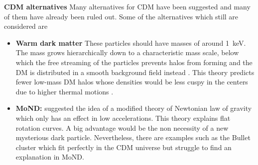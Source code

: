 \textbf{\ac{CDM} alternatives} Many alternatives for \ac{CDM} have been suggested and many of them have already been ruled out. Some of the alternatives which still are considered are 
\begin{itemize}
    \item \textbf{Warm dark matter} These particles should have masses of around \SI{1}{keV}. The mass grows hierarchically down to a characteristic mass scale, below which the free streaming of the particles prevents halos from forming and the \ac{DM} is distributed in a smooth background field instead \citep{Smith...WDM..2011, Schneider...WDM...2013}. This theory predicts fewer low-mass \ac{DM} halos whose densities would be less cuspy in the centers due to higher thermal motions \citep{Bode...WDM...2001}.
    \item \textbf{\ac{MoND}:} \cite{Milgrom...MoND...1983} suggested the idea of a modified theory of Newtonian law of gravity which only has an effect in low accelerations. This theory explains flat rotation curves. A big advantage would be the non necessity of a new mysterious dark particle. Nevertheless, there are examples such as the Bullet cluster \citep{Clowe...Bullett...2006} which fit perfectly in the \ac{CDM} universe but struggle to find an explanation in \ac{MoND}.
\end{itemize}

